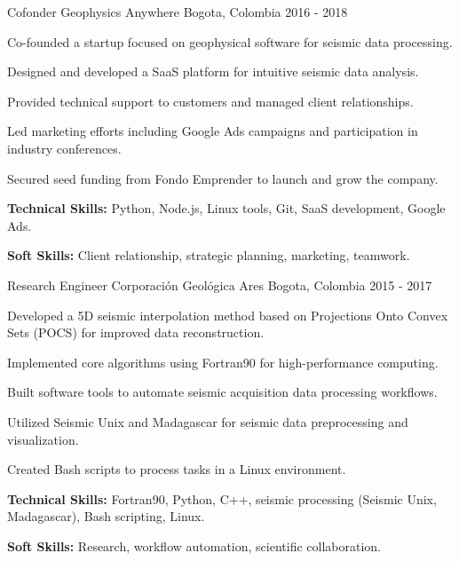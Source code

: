 \begin{cventries}
  \cventry
    {Cofonder} %
    {Geophysics Anywhere} %
    {Bogota, Colombia} %
    {2016 - 2018} %
    {
      \begin{cvitems} %
        \item {Co-founded a startup focused on geophysical software for seismic data processing.}
        \item {Designed and developed a SaaS platform for intuitive seismic data analysis.}
        \item {Provided technical support to customers and managed client relationships.}
        \item {Led marketing efforts including Google Ads campaigns and participation in industry conferences.}
        \item {Secured seed funding from Fondo Emprender to launch and grow the company.}
        \item {\textbf{Technical Skills:} Python, Node.js, Linux tools, Git, SaaS development, Google Ads.}
        \item {\textbf{Soft Skills:} Client relationship, strategic planning, marketing, teamwork.}
      \end{cvitems}
    }

    \cventry
      {Research Engineer} %
      {Corporación Geológica Ares} %
      {Bogota, Colombia} %
      {2015 - 2017} %
      {
        \begin{cvitems} %
          \item {Developed a 5D seismic interpolation method based on Projections Onto Convex Sets (POCS) for improved data reconstruction.}
          \item {Implemented core algorithms using Fortran90 for high-performance computing.}
          \item {Built software tools to automate seismic acquisition data processing workflows.}
          \item {Utilized Seismic Unix and Madagascar for seismic data preprocessing and visualization.}
          \item {Created Bash scripts to process tasks in a Linux environment.}
          \item {\textbf{Technical Skills:} Fortran90, Python, C++, seismic processing (Seismic Unix, Madagascar), Bash scripting, Linux.}
          \item {\textbf{Soft Skills:} Research, workflow automation, scientific collaboration.}
        \end{cvitems}
      }


\end{cventries}
